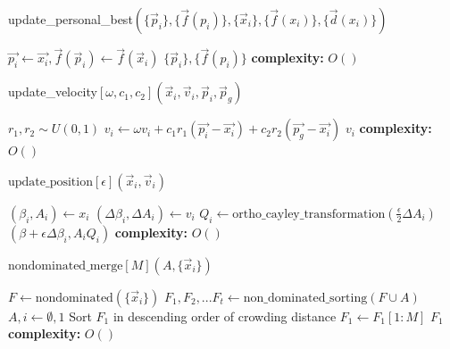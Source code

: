 \begin{algorithm}[H]
\caption{update\_personal\_best$(\{\vec{p}_i\}, \{\vec{f}(p_i)\},\{\vec{x}_i\}, \{\vec{f}(x_i)\}, \{\vec{d}(x_i)\})$}
\label{alg:mopso}
\begin{algorithmic}[1]
\State $\vec{p_i} \gets \vec{x_i}, \vec{f}(\vec{p}_i) \gets \vec{f}(\vec{x}_i)$
\EndIf
\EndFor
\State \Return $\{\vec{p}_i\}, \{\vec{f}(p_i)\} $
\State \textbf{complexity: } $O()$
\end{algorithmic}
\end{algorithm}

\begin{algorithm}[H]
\caption{update\_velocity$[\omega,c_1, c_2](\vec{x}_i,\vec{v}_i,\vec{p}_i,\vec{p}_g)$}
\label{alg:update_vel}
\begin{algorithmic}[1]
\State $r_1, r_2 \sim U(0,1)$
\State $v_i \gets \omega v_i + c_1 r_1 (\vec{p_i} - \vec{x_i}) + c_2 r_2 (\vec{p_g} - \vec{x_i})$
\State \Return $v_i$
\State \textbf{complexity: } $O()$
\end{algorithmic}
\end{algorithm}

\begin{algorithm}[H]
\caption{$\text{update\_position}[\epsilon](\vec{x}_i,\vec{v}_i)$}
\label{update_pos}
\begin{algorithmic}[1]
\State $(\beta_i,A_i) \gets x_i$
\State $(\Delta \beta_i,\Delta A_i) \gets v_i$
\State $Q_i \gets \text{ortho\_cayley\_transformation}(\frac{\epsilon}{2}\Delta A_i)$
\State \Return $(\beta+\epsilon \Delta \beta_i,A_iQ_i)$
\State \textbf{complexity: } $O()$
\end{algorithmic}
\end{algorithm}

\begin{algorithm}[H]
\caption{$\text{nondominated\_merge}[M](A, \{\vec{x}_i\})$}
\label{mopso_non_dominated_merge}
\begin{algorithmic}[1]
\State $F \gets \text{nondominated}(\{\vec{x}_i\})$
\State $F_1,F_2,...F_t \gets \text{non\_dominated\_sorting}(F\cup A)$
\State $A , i \gets \emptyset, 1 $
\State Sort $F_1$ in descending order of crowding distance
\State $F_1 \gets F_1[1:M]$ 
\EndIf
\State \Return $F_1$
\State \textbf{complexity: } $O()$
\end{algorithmic}
\end{algorithm}

